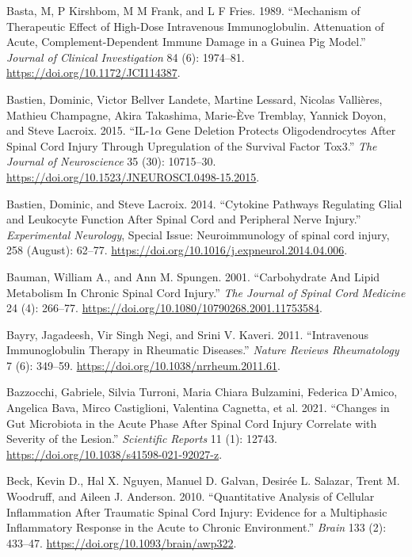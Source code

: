 \documentclass[9pt,lineno]{elife}
\newlength{\cslhangindent}
\newlength{\cslentryspacingunit} %
\newenvironment{CSLReferences}[2] %
 {%
  \setlength{\parindent}{0pt}
  \ifodd #1
  \let\oldpar\par
  \def\par{\hangindent=\cslhangindent\oldpar}
  \fi
  \setlength{\parskip}{#2\cslentryspacingunit}
 }%
 {}
\begin{document}
\begin{landscape}
\begin{landscape}
\begin{landscape}
\begin{landscape}
\begin{CSLReferences}{1}{0}
\leavevmode{}%
Basta, M, P Kirshbom, M M Frank, and L F Fries. 1989. {``Mechanism of Therapeutic Effect of High-Dose Intravenous Immunoglobulin. {Attenuation} of Acute, Complement-Dependent Immune Damage in a Guinea Pig Model.''} \emph{Journal of Clinical Investigation} 84 (6): 1974--81. \url{https://doi.org/10.1172/JCI114387}.

\leavevmode{}%
Bastien, Dominic, Victor Bellver Landete, Martine Lessard, Nicolas Vallières, Mathieu Champagne, Akira Takashima, Marie-Ève Tremblay, Yannick Doyon, and Steve Lacroix. 2015. {``{IL-1\(\alpha\) Gene Deletion Protects Oligodendrocytes} After {Spinal Cord Injury} Through {Upregulation} of the {Survival Factor Tox3}.''} \emph{The Journal of Neuroscience} 35 (30): 10715--30. \url{https://doi.org/10.1523/JNEUROSCI.0498-15.2015}.

\leavevmode{}%
Bastien, Dominic, and Steve Lacroix. 2014. {``Cytokine Pathways Regulating Glial and Leukocyte Function After Spinal Cord and Peripheral Nerve Injury.''} \emph{Experimental Neurology}, Special {Issue}: {Neuroimmunology} of spinal cord injury, 258 (August): 62--77. \url{https://doi.org/10.1016/j.expneurol.2014.04.006}.

\leavevmode{}%
Bauman, William A., and Ann M. Spungen. 2001. {``Carbohydrate {And Lipid Metabolism In Chronic Spinal Cord Injury}.''} \emph{The Journal of Spinal Cord Medicine} 24 (4): 266--77. \url{https://doi.org/10.1080/10790268.2001.11753584}.

\leavevmode{}%
Bayry, Jagadeesh, Vir Singh Negi, and Srini V. Kaveri. 2011. {``Intravenous Immunoglobulin Therapy in Rheumatic Diseases.''} \emph{Nature Reviews Rheumatology} 7 (6): 349--59. \url{https://doi.org/10.1038/nrrheum.2011.61}.

\leavevmode{}%
Bazzocchi, Gabriele, Silvia Turroni, Maria Chiara Bulzamini, Federica D'Amico, Angelica Bava, Mirco Castiglioni, Valentina Cagnetta, et al. 2021. {``Changes in Gut Microbiota in the Acute Phase After Spinal Cord Injury Correlate with Severity of the Lesion.''} \emph{Scientific Reports} 11 (1): 12743. \url{https://doi.org/10.1038/s41598-021-92027-z}.

\leavevmode{}%
Beck, Kevin D., Hal X. Nguyen, Manuel D. Galvan, Desirée L. Salazar, Trent M. Woodruff, and Aileen J. Anderson. 2010. {``Quantitative Analysis of Cellular Inflammation After Traumatic Spinal Cord Injury: Evidence for a Multiphasic Inflammatory Response in the Acute to Chronic Environment.''} \emph{Brain} 133 (2): 433--47. \url{https://doi.org/10.1093/brain/awp322}.


\end{CSLReferences}
\end{landscape}
\end{landscape}
\end{landscape}
\end{landscape}
\end{document}
